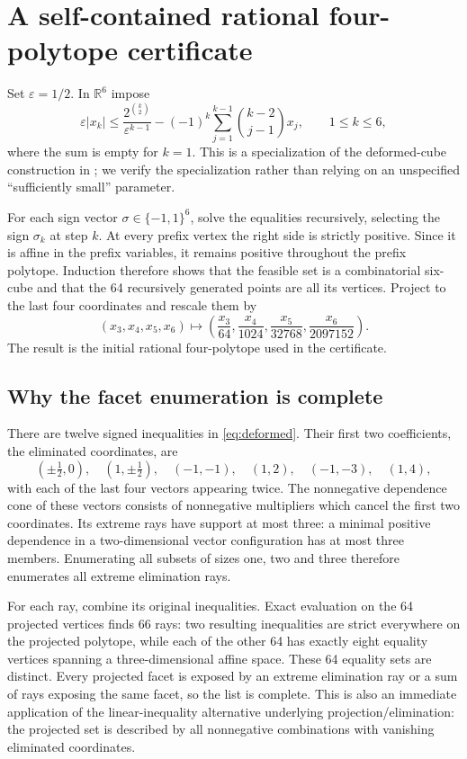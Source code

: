 \documentclass[11pt,a4paper]{article}
\theoremstyle{definition}\newtheorem{definition}[theorem]{Definition}
\theoremstyle{remark}\newtheorem{remark}[theorem]{Remark}
\newcommand{\R}{\mathbb R}\newcommand{\Z}{\mathbb Z}\newcommand{\conv}{\operatorname{conv}}
\begin{document}
\section{A self-contained rational four-polytope certificate}\label{sec:rational}
Set \(\varepsilon=1/2\). In \(\R^6\) impose
\begin{equation}\label{eq:deformed}
 \varepsilon |x_k|\le
 \frac{2^{\binom{k}{2}}}{\varepsilon^{k-1}}
 -(-1)^k\sum_{j=1}^{k-1}\binom{k-2}{j-1}x_j,
 \qquad 1\le k\le6,
\end{equation}
where the sum is empty for \(k=1\). This is a specialization of the deformed-cube construction in \citet{JZ}; we verify the specialization rather than relying on an unspecified ``sufficiently small'' parameter.

For each sign vector \(\sigma\in\{-1,1\}^6\), solve the equalities recursively, selecting the sign \(\sigma_k\) at step \(k\). At every prefix vertex the right side is strictly positive. Since it is affine in the prefix variables, it remains positive throughout the prefix polytope. Induction therefore shows that the feasible set is a combinatorial six-cube and that the 64 recursively generated points are all its vertices. Project to the last four coordinates and rescale them by
\[
 (x_3,x_4,x_5,x_6)\mapsto
 \left(\frac{x_3}{64},\frac{x_4}{1024},\frac{x_5}{32768},\frac{x_6}{2097152}\right).
\]
The result is the initial rational four-polytope used in the certificate.

\subsection{Why the facet enumeration is complete}
There are twelve signed inequalities in \eqref{eq:deformed}. Their first two coefficients, the eliminated coordinates, are
\[
 (\pm\tfrac12,0),\quad(1,\pm\tfrac12),\quad
 (-1,-1),\quad(1,2),\quad(-1,-3),\quad(1,4),
\]
with each of the last four vectors appearing twice. The nonnegative dependence cone of these vectors consists of nonnegative multipliers which cancel the first two coordinates. Its extreme rays have support at most three: a minimal positive dependence in a two-dimensional vector configuration has at most three members. Enumerating all subsets of sizes one, two and three therefore enumerates all extreme elimination rays.

For each ray, combine its original inequalities. Exact evaluation on the 64 projected vertices finds 66 rays: two resulting inequalities are strict everywhere on the projected polytope, while each of the other 64 has exactly eight equality vertices spanning a three-dimensional affine space. These 64 equality sets are distinct. Every projected facet is exposed by an extreme elimination ray or a sum of rays exposing the same facet, so the list is complete. This is also an immediate application of the linear-inequality alternative underlying projection/elimination: the projected set is described by all nonnegative combinations with vanishing eliminated coordinates.
\end{document}
